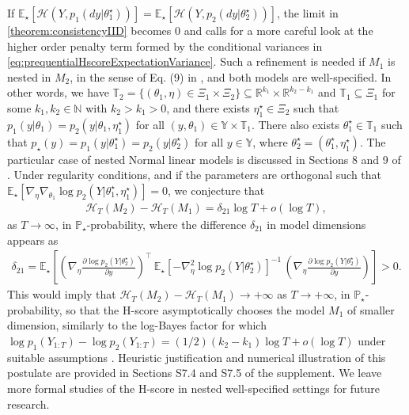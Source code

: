 \documentclass[12pt]{article}
\theoremstyle{plain}
\theoremstyle{definition}
\newcommand{\suppheuristicnested}{ S7.4 }
\newcommand{\suppnumericalillustrationnested}{ S7.5 }
\begin{document}
	If
	$\mathbb{E}_\star\left[\mathcal{H}\left(Y,p_{1}(dy|\theta^\star_1)\right)\right]=
	\mathbb{E}_\star\left[\mathcal{H}\left(Y,p_{2}(dy|\theta^\star_2)\right)\right]$, the limit in \eqref{theorem:consistencyIID} becomes 0 and calls for a more careful look at the higher order penalty term formed by the conditional variances in 
	\eqref{eq:prequentialHscoreExpectationVariance}. Such a refinement is needed if $M_1$ is nested in $M_2$, in the sense of Eq.\! (9) in \cite{bergerPericchi1996}, and both models are well-specified. In other words, we have $\mathbb{T}_2 = \{(\theta_1,\eta)\in\Xi_1\times\Xi_2\}\subseteq\mathbb{R}^{k_1}\times\mathbb{R}^{k_2-k_1}$ and $\mathbb{T}_1 \subseteq \Xi_1$ for some $k_1,k_2\in\mathbb{N}$ with $k_2 > k_1 > 0$, and there exists $\eta_1^\star\in\Xi_2$ such that $p_1(y|\theta_1) = p_2(y|\theta_1,\eta_1^\star)$ for all $(y,\theta_1)\in\mathbb{Y}\times\mathbb{T}_1$. There also exists $\theta_1^\star\in\mathbb{T}_1$ such that $ p_\star(y) = p_1(y|\theta_1^\star) = p_2(y|\theta_2^\star) $ for all $y\in\mathbb{Y}$, where $\theta_2^\star = (\theta_1^\star,\eta_1^\star)$. The particular case of nested Normal linear models is discussed in Sections 8 and 9 of \citet[][]{dawid2015}. Under regularity conditions, and if the parameters are orthogonal such that $\mathbb{E}_\star[\nabla_{\eta}\nabla_{\theta_1}\log p_2(Y|\theta_1^\star,\eta_1^\star)] = 0$, we conjecture that
	\begin{align*}
	\mathcal{H}_{T}({M_2})-\mathcal{H}_{T}({M_1}) = \delta_{21} \log T + o(\log T),
	\end{align*}
	as $T\to\infty$, in $\mathbb{P}_\star$-probability, where the difference $\delta_{21}$ in model dimensions appears as
	\begin{align*}
	\delta_{21} = \mathbb{E}_\star\left[\left(\nabla_{\eta}\frac{\partial \log p_2(Y|\theta_2^\star)}{\partial y}\right)^\top\, \mathbb{E}_\star[-\nabla^2_{\eta}\log p_2(Y|\theta_2^\star)]^{-1}\, \left(\nabla_{\eta}\frac{\partial \log p_2(Y|\theta_2^\star)}{\partial y}\right)\right]>0.
	\end{align*}
	This would imply that $\mathcal{H}_{T}({M_2})-\mathcal{H}_{T}({M_1})\to+\infty$ as $T\to+\infty$, in $\mathbb{P}_\star$-probability, so that the H-score asymptotically chooses the model $M_1$ of smaller dimension, similarly to the log-Bayes factor for which $\log p_1(Y_{1:T})-\log p_2(Y_{1:T}) = (1/2)(k_2-k_1)\log T + o(\log T)$  under suitable assumptions \citep[e.g.][]{moreno2010,rousseau2012,chib2016}. Heuristic justification and numerical illustration of this postulate are provided in Sections\suppheuristicnested and\suppnumericalillustrationnested of the supplement. We leave more formal studies of the H-score in nested well-specified settings for future research.
	
\end{document}
